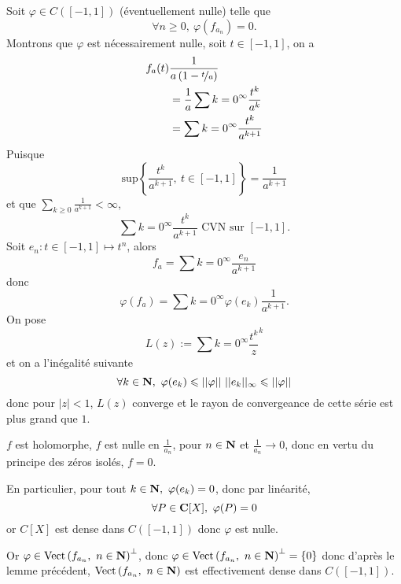 \documentclass[a4paper,11pt, twoside]{article}
\begin{document}
\begin{Proof}
  Soit $\varphi\in C([-1,1])$ (éventuellement nulle) telle que 
  $$\forall n\geqslant 0,\ \varphi(f_{a_n})=0.$$
  Montrons que $\varphi$ est nécessairement nulle, soit $t\in[-1,1]$, on a 
  \begin{align*}
    f_a(t)&\frac{1}{a\left(1-\nicefrac{t}{a}\right)}\\
    &=\frac{1}{a}\sum{k=0}^\infty\frac{t^k}{a^k}\\
    &=\sum{k=0}^\infty\frac{t^k}{a^{k+1}}
  \end{align*}
  Puisque 
  $$\mathrm{sup}\left\{\frac{t^k}{a^{k+1}},\ t\in[-1,1]\right\}=\frac{1}{a^{k+1}}$$
  et que $\sum_{k\geqslant 0}\frac{1}{a^{k+1}}<\infty$,
  $$\sum{k=0}^\infty\frac{t^k}{a^{k+1}}\text{ CVN sur }[-1,1].$$
  Soit $e_n:t\in[-1,1]\longmapsto t^n$, alors 
  $$f_a=\sum{k=0}^\infty\frac{e_n}{a^{k+1}}$$
  donc
  $$\varphi(f_a)=\sum{k=0}^\infty\varphi(e_k)\frac{1}{a^{k+1}}.$$
  On pose 
  $$L(z):=\sum{k=0}^\infty\frac{t^k}z^k$$
  et on a l'inégalité suivante 
  $$\forall k\in\mathbf N,\ \varphi(e_k)\leqslant ||\varphi||\ ||e_k||_\infty\leqslant ||\varphi||$$
  donc pour $|z|<1$, $L(z)$ converge et le rayon de convergeance de cette série est plus grand que $1$.

  $f$ est holomorphe, $f$ est nulle en $\frac{1}{a_n}$, pour $n\in\mathbf N$ et $\frac{1}{a_n}\longrightarrow 0$, donc en vertu du principe des zéros isolés, $f=0$.

  En particulier, pour tout $k\in \N,\ \varphi(e_k)=0$, donc par linéarité, 
  $$\forall P\in \mathbf C[X],\ \varphi(P)=0$$
  or $C[X]$ est dense dans $C([-1,1])$ donc $\varphi$ est nulle.

  Or $\varphi\in \mathrm{Vect}\left(f_{a_n},\ n\in\N\right)^\bot$, donc $\varphi\in \mathrm{Vect}\left(f_{a_n},\ n\in\mathbf N\right)^\bot=\{0\}$ donc d'après le lemme précédent, $\mathrm{Vect}\left(f_{a_n},\ n\in\mathbf N\right)$ est effectivement dense dans $C([-1,1])$.
\end{Proof}


\setcounter{prop}{0}




\end{document}
